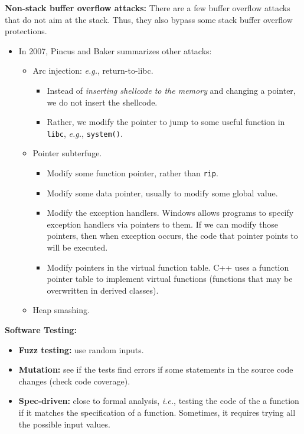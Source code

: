 \documentclass{article}
\newcommand{\parhead}[1]{\noindent \textbf{#1}}
\begin{document}
\parhead{Non-stack buffer overflow attacks:} There are a few buffer overflow attacks that do not aim at the stack. Thus, they also bypass some stack buffer overflow protections.
\begin{itemize}
    \item In 2007, Pincus and Baker summarizes other attacks:
    \begin{itemize}
        \item Arc injection: \emph{e.g.}, return-to-libc.
        \begin{itemize}
            \item Instead of \emph{inserting shellcode to the memory} and changing a pointer, we do not insert the shellcode.
            \item Rather, we modify the pointer to jump to some useful function in \texttt{libc}, \emph{e.g.}, \texttt{system()}.
        \end{itemize}
        
        \item Pointer subterfuge.
        \begin{itemize}
            \item Modify some function pointer, rather than \texttt{rip}.
         
            \item Modify some data pointer, usually to modify some global value.
            
            \item Modify the exception handlers. Windows allows programs to specify exception handlers via pointers to them. If we can modify those pointers, then when exception occurs, the code that pointer points to will be executed.
            
            \item Modify pointers in the virtual function table. C++ uses a function pointer table to implement virtual functions (functions that may be overwritten in derived classes). 
        \end{itemize}
        
        \item Heap smashing.
    \end{itemize}
\end{itemize}

\parhead{Software Testing:} 
\begin{itemize}
    \item \textbf{Fuzz testing:} use random inputs.
    
    \item \textbf{Mutation:} see if the tests find errors if some statements in the source code changes (check code coverage).
    
    \item \textbf{Spec-driven:} close to formal analysis, \emph{i.e.}, testing the code of the a function if it matches the specification of a function. Sometimes, it requires trying all the possible input values.
\end{itemize}
\end{document}
